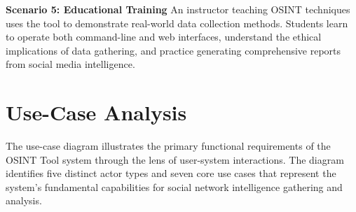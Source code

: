 \documentclass[13pt,a4paper]{report}
\begin{document}
\textbf{Scenario 5: Educational Training}
An instructor teaching OSINT techniques uses the tool to demonstrate real-world data collection methods. Students learn to operate both command-line and web interfaces, understand the ethical implications of data gathering, and practice generating comprehensive reports from social media intelligence.

\section{Use-Case Analysis}
The use-case diagram illustrates the primary functional requirements of the OSINT Tool system through the lens of user-system interactions. The diagram identifies five distinct actor types and seven core use cases that represent the system's fundamental capabilities for social network intelligence gathering and analysis.
\end{document}
